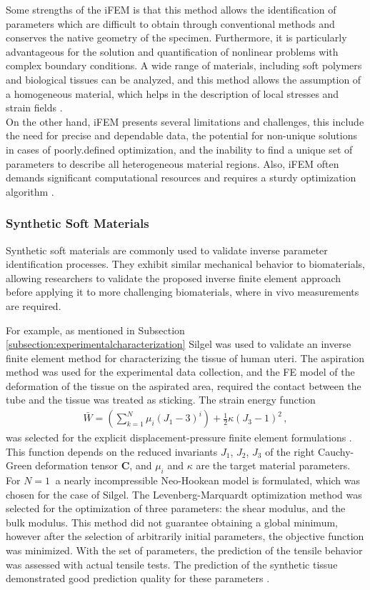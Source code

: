 Some strengths of the iFEM is that this method allows the identification of parameters which are difficult to obtain 
through conventional methods and conserves the native geometry of the specimen. Furthermore, it is particularly advantageous for the 
solution and quantification of nonlinear problems with complex boundary conditions. A wide 
range of materials, including soft polymers and biological tissues can be analyzed, and this method allows the 
assumption of a homogeneous material, which helps in the description of local stresses and strain fields \cite{Seshaiyer2003}.\\

On the other hand, iFEM presents several limitations and challenges, this include the need for precise and dependable 
data, the potential for non-unique solutions in cases of poorly.defined optimization, and the  inability to find a 
unique set of parameters to describe all heterogeneous material regions. Also, iFEM often demands
significant computational resources and requires a sturdy optimization algorithm \cite{Giudice2021}.\\

\subsubsection*{Synthetic Soft Materials}
Synthetic soft materials are commonly used to validate inverse parameter identification processes. 
They exhibit similar mechanical behavior to biomaterials, allowing researchers to validate the proposed 
inverse finite element approach before applying it to more challenging biomaterials, where in vivo measurements are required.

For example, as mentioned in Subsection \ref{subsection:experimentalcharacterization} Silgel was used to validate an inverse
finite element method for characterizing the tissue of human uteri. The aspiration method was used for the experimental data collection, 
and the FE model of the deformation of the tissue on the aspirated area, required the contact 
between the tube and the tissue was treated as sticking. The strain energy function 
\begin{align}
        \bar{W} = (\sum_{k=1}^N \mu_i(J_1 - 3)^i) + \frac{1}{2}\kappa(J_3 - 1)^2 \,,
\end{align}
was selected for the explicit displacement-pressure finite element formulations \cite{Sussman1987}. 
This function depends on the reduced invariants $J_1$, $J_2$, $J_3$ of the right Cauchy-Green 
deformation tensor $\boldsymbol{C}$, and $\mu_i$ and $\kappa$ are the target material parameters. For $N = \SI{1}{}$ a nearly incompressible Neo-Hookean model 
is formulated, which was chosen for the case of Silgel. The Levenberg-Marquardt optimization method was selected for the optimization 
of three parameters: the shear modulus, and the bulk modulus. This method did not guarantee obtaining a global minimum, however after the selection of arbitrarily 
initial parameters, the objective function was minimized. With the set of parameters, the prediction of the tensile behavior was assessed with 
actual tensile tests. The prediction of the synthetic tissue demonstrated good prediction quality for these parameters \cite{Kauer2002}.


